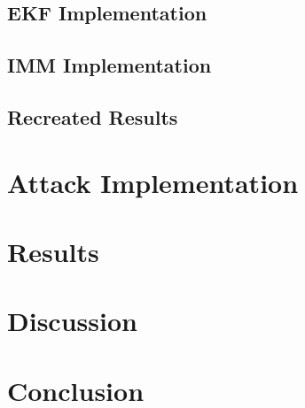 \documentclass[]{article}
\begin{document}
\subsection{EKF Implementation}



\subsection{IMM Implementation}




\subsection{Recreated Results}







\newpage
\section{Attack Implementation}








\newpage
\section{Results}







\newpage
\section{Discussion}%







\newpage
\section{Conclusion} %
\end{document}
